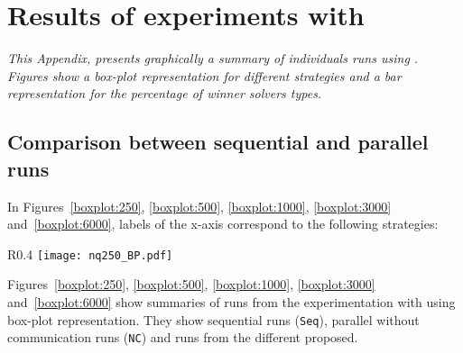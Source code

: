 \chapter{Results of experiments with \nqp}
\label{app:nqp}
\textit{This Appendix, presents graphically a summary of individuals runs using \nqp. Figures show a \textit{box-plot} representation for different strategies and a bar representation for the percentage of winner solvers types.}
\vfill
\newpage

\section{Comparison between sequential and parallel runs}

In Figures~\ref{boxplot:250}, \ref{boxplot:500}, \ref{boxplot:1000}, \ref{boxplot:3000} and~\ref{boxplot:6000}, labels of the x-axis correspond to the following strategies:


\begin{wrapfigure}{R}{0.4\textwidth}
\centering
\texttt{[image: nq250\_BP.pdf]}
\caption{Different communication strategies to solve 250-Queens using \posl}\label{boxplot:250}
\end{wrapfigure}

Figures~\ref{boxplot:250}, \ref{boxplot:500}, \ref{boxplot:1000}, \ref{boxplot:3000} and~\ref{boxplot:6000} show summaries of runs from the experimentation with \nqp{} using box-plot representation. They show sequential runs (\texttt{Seq}), parallel without communication runs (\texttt{NC}) and runs from the different \commstrs{} proposed.

